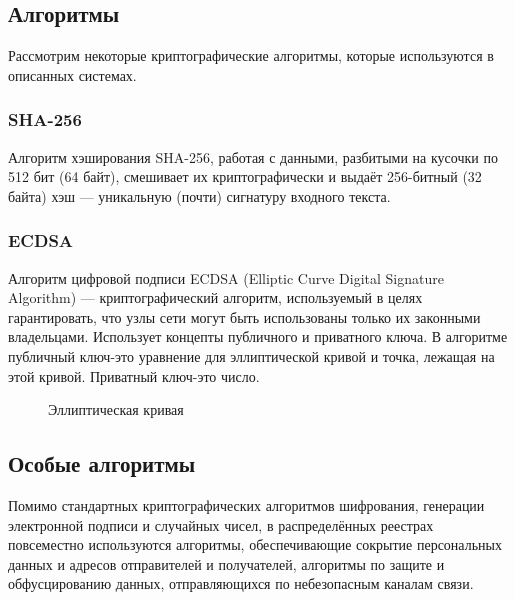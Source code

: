 \subsection{Алгоритмы}
Рассмотрим некоторые криптографические алгоритмы, которые используются в описанных системах.
\subsubsection{SHA-256}
Алгоритм хэширования SHA-256, работая с данными, разбитыми на кусочки по 512
бит (64 байт), смешивает их криптографически и выдаёт 256-битный (32 байта) хэш
--- уникальную (почти) сигнатуру входного текста.
\subsubsection{ECDSA}
Алгоритм цифровой подписи ECDSA (Elliptic Curve Digital Signature Algorithm)
--- криптографический алгоритм, используемый в целях гарантировать, что узлы
сети могут быть использованы только их законными владельцами. Использует
концепты публичного и приватного ключа. В алгоритме публичный ключ-это
уравнение для эллиптической кривой и точка, лежащая на этой кривой. Приватный
ключ-это число.

\begin{figure}[h]
    \centering
    \caption{Эллиптическая кривая}\label{elliptic_curve}
\end{figure}


\subsection{Особые алгоритмы}
Помимо стандартных криптографических алгоритмов шифрования, генерации
электронной подписи и случайных чисел, в распределённых реестрах повсеместно
используются алгоритмы, обеспечивающие сокрытие персональных данных и адресов
отправителей и получателей, алгоритмы по защите и обфусцированию данных,
отправляющихся по небезопасным каналам связи.
